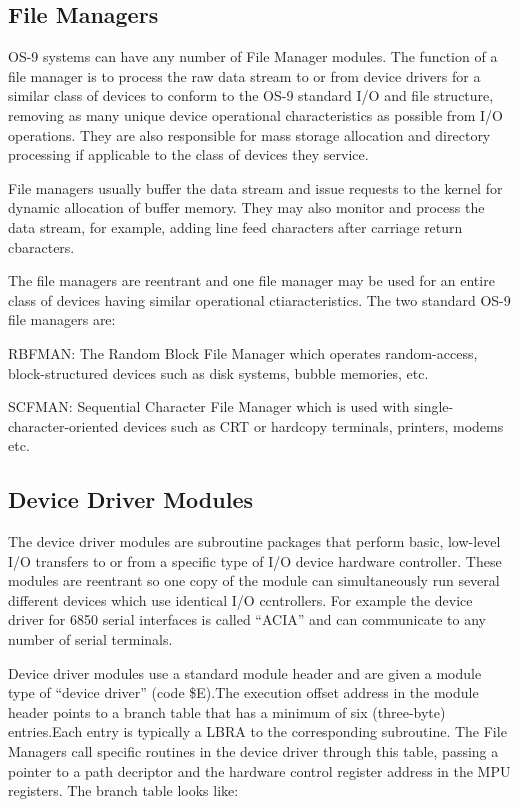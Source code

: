 \documentclass[
]{article}
\begin{document}
\subsection{File Managers}

OS-9 systems can have any number of File Manager modules. The function
of a file manager is to process the raw data stream to or from device
drivers for a similar class of devices to conform to the OS-9 standard
I/O and file structure, removing as many unique device operational
characteristics as possible from I/O operations. They are also
responsible for mass storage allocation and directory processing if
applicable to the class of devices they service.

File managers usually buffer the data stream and issue requests to the
kernel for dynamic allocation of buffer memory. They may also monitor
and process the data stream, for example, adding line feed characters
after carriage return cbaracters.

The file managers are reentrant and one file manager may be used for an
entire class of devices having similar operational ctiaracteristics. The
two standard OS-9 file managers are:

RBFMAN: The Random Block File Manager which operates random-access,
block-structured devices such as disk systems, bubble memories, etc.

SCFMAN: Sequential Character File Manager which is used with
single-character-oriented devices such as CRT or hardcopy terminals,
printers, modems etc.

\subsection{Device Driver Modules}

The device driver modules are subroutine packages that perform basic,
low-level I/O transfers to or from a specific type of I/O device
hardware controller. These modules are reentrant so one copy of the
module can simultaneously run several different devices which use
identical I/O ccntrollers. For example the device driver for 6850 serial
interfaces is called ``ACIA'' and can communicate to any number of
serial terminals.

Device driver modules use a standard module header and are given a
module type of ``device driver'' (code \$E).The execution offset address
in the module header points to a branch table that has a minimum of six
(three-byte) entries.Each entry is typically a LBRA to the corresponding
subroutine. The File Managers call specific routines in the device
driver through this table, passing a pointer to a path decriptor and the
hardware control register address in the MPU registers. The branch table
looks like:
\end{document}
